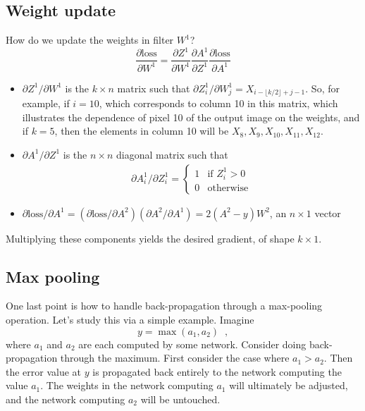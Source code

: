 
\subsection{Weight update}
How do we update the weights in filter $W^1$?
\[\frac{\partial \text{loss}}{\partial W^1}
  = \frac{\partial Z^1}{\partial W^1}
  \frac{\partial A^1}{\partial Z^1}
  \frac{\partial \text{loss}}{\partial A^1}\]
\begin{itemize}
  \item $\partial Z^1/\partial W^1$ is the $k \times n$
        matrix such that $\partial Z_i^1/\partial W_j^1 =
          X_{i-\lfloor k/2 \rfloor+j-1}$.  So, for example, if $i = 10$,
        which corresponds to column 10 in this matrix, which illustrates
        the dependence of pixel 10 of the output image on the weights, and
        if  $k = 5$, then the
        elements in column 10 will  be $X_8, X_9, X_{10}, X_{11},
          X_{12}$.
  \item $\partial A^1/\partial Z^1$ is the $n \times n$
        diagonal matrix such that
        \begin{eqnarray*}\partial A_i^1/\partial Z_i^1=
          \begin{cases}
            1 & \text{if $Z_i^1 > 0$} \\
            0 & \text{otherwise}
          \end{cases}
        \end{eqnarray*}
  \item $\partial \text{loss}/{\partial A^1}
          = (\partial \text{loss} / {\partial A^2})
          (\partial A^2 / {\partial A^1})
          = 2(A^2 - y)W^2$, an $n \times 1$ vector
\end{itemize}
Multiplying these components yields the desired gradient, of shape
$k \times 1$.

\subsection{Max pooling}
One last point is how to handle back-propagation through a max-pooling
operation.  Let's study this via a simple example.  Imagine
\[y = \max(a_1, a_2)\;\;,\]
where $a_1$ and $a_2$ are each computed by some network.
Consider doing back-propagation through the maximum. First consider the case where $a_1 > a_2$. Then the error %
value at $y$ is propagated back entirely to the network computing the value  $a_1$. The weights in the network computing  $a_1$ will ultimately be adjusted, and the network computing  $a_2$ will be untouched.


